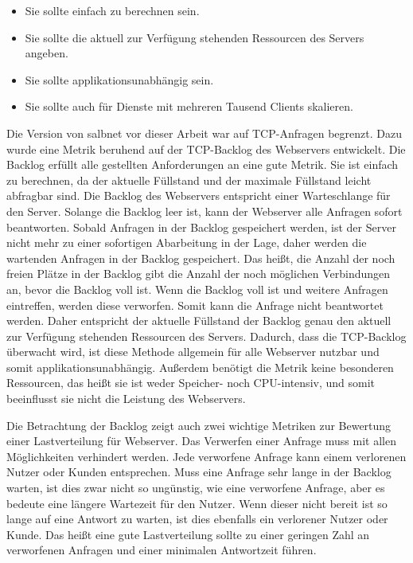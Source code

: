 \documentclass[a4paper, 12pt, BCOR10mm, DIV12, toc=bibliography, toc=listof, german]{scrbook}
\begin{document}
			\begin{itemize}
				\item Sie sollte einfach zu berechnen sein.
				\item Sie sollte die aktuell zur Verfügung stehenden Ressourcen des Servers angeben.
				\item Sie sollte applikationsunabhängig sein.
				\item Sie sollte auch für Dienste mit mehreren Tausend Clients skalieren.
			\end{itemize}

			Die Version von salbnet vor dieser Arbeit war auf TCP-Anfragen begrenzt. Dazu wurde eine
			Metrik beruhend auf der TCP-Backlog des Webservers entwickelt. Die Backlog erfüllt alle
			gestellten Anforderungen an eine gute Metrik. Sie ist einfach zu berechnen, da der aktuelle
			Füllstand und der maximale Füllstand leicht abfragbar sind. Die Backlog des Webservers
			entspricht einer Warteschlange für den Server. Solange die Backlog leer ist, kann der
			Webserver alle Anfragen sofort beantworten.  Sobald Anfragen in der Backlog gespeichert
			werden, ist der Server nicht mehr zu einer sofortigen Abarbeitung in der Lage, daher werden
			die wartenden Anfragen in der Backlog gespeichert. Das heißt, die Anzahl der noch freien
			Plätze in der Backlog gibt die Anzahl der noch möglichen Verbindungen an, bevor die Backlog
			voll ist. Wenn die Backlog voll ist und weitere Anfragen eintreffen, werden diese verworfen.
			Somit kann die Anfrage nicht beantwortet werden.  Daher entspricht der aktuelle Füllstand der
			Backlog genau den aktuell zur Verfügung stehenden Ressourcen des Servers. Dadurch, dass die
			TCP-Backlog überwacht wird, ist diese Methode allgemein für alle Webserver nutzbar und somit
			applikationsunabhängig. Außerdem benötigt die Metrik keine besonderen Ressourcen, das heißt sie
			ist weder Speicher- noch CPU-intensiv, und somit beeinflusst sie nicht die Leistung des
			Webservers.

			Die Betrachtung der Backlog zeigt auch zwei wichtige Metriken zur Bewertung einer Lastverteilung
			für Webserver. Das Verwerfen einer Anfrage muss mit allen Möglichkeiten verhindert werden. Jede
			verworfene Anfrage kann einem verlorenen Nutzer oder Kunden entsprechen. Muss eine Anfrage sehr
			lange in der Backlog warten, ist dies zwar nicht so ungünstig, wie eine verworfene Anfrage, aber
			es bedeute eine längere Wartezeit für den Nutzer. Wenn dieser nicht bereit ist so lange auf eine
			Antwort zu warten, ist dies ebenfalls ein verlorener Nutzer oder Kunde. Das heißt eine gute
			Lastverteilung sollte zu einer geringen Zahl an verworfenen Anfragen und einer minimalen
			Antwortzeit führen.
\end{document}

